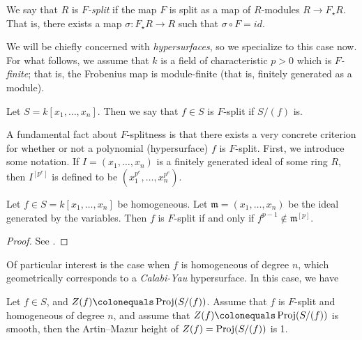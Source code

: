 \begin{defn}
	We say that \(R\) is \textit{\(F\)-split} if the map \(F\) is
	split as a map of
	\(R\)-modules \(R \xrightarrow{} F_{\star}R\).
    That is, there exists a map \(\sigma : F_{\star}R \xrightarrow{} R\)
    such that \(\sigma \circ F = id\).
\end{defn}

We will be chiefly concerned with \textit{hypersurfaces},
so we specialize to this case now.
For what follows, we assume that \(k\) is a field
of characteristic \(p > 0\) which is
\textit{\(F\)-finite}; that is, the Frobenius
map is module-finite (that is, finitely generated as a module).

\begin{defn}
	Let \(S = k[x_{1}, \ldots, x_{n}]\).
	Then we say that \(f \in S\) is \(F\)-split if
	\(S / (f)\) is.
\end{defn}

A fundamental fact about \(F\)-splitness is that there
exists a very concrete criterion for whether or
not a polynomial (hypersurface) \(f\) is \(F\)-split.
First, we introduce some notation.
If \(I = (x_{1}, \ldots, x_{n})\) is a finitely generated
ideal of some ring \(R\),
then \(I^{[p^{e}]}\)
is defined to be \((x_{1}^{p^{e}}, \ldots, x_{n}^{p^{e}})\).

\begin{thm}
    \label{thm:fedder:criterion}
	Let \(f \in S = k[x_{1}, \ldots, x_{n}]\) be homogeneous.
	Let \(\mathfrak{m} = (x_{1}, \ldots, x_{n})\)
	be the ideal generated by the variables.
	Then \(f\) is \(F\)-split if and only if
	\(f^{p-1} \notin \mathfrak{m}^{[p]}\).
\end{thm}

\begin{proof}
	See \cite[Theorem~2.5]{ma-polstra-2021-F-sing-comm-alg}.
\end{proof}

Of particular interest is the case when \(f\) is
homogeneous of degree \(n\), which geometrically
corresponds to a \textit{Calabi-Yau} hypersurface.
In this case, we have

\begin{thm}
	\label{thm:fsplit:ordinary}
	Let \(f \in S\), and
    \(Z(f) \colonequals \Proj (S / (f))\).
    Assume that \(f\) is \(F\)-split and homogeneous of degree \(n\),
	and assume that \(Z(f) \colonequals \Proj(S/(f))\) is smooth,
	then the Artin--Mazur height
	of \(Z(f) = \operatorname{Proj} (S / (f))\)
	is 1.
\end{thm}

